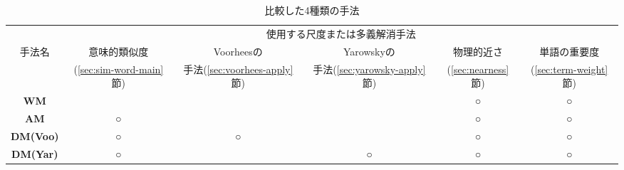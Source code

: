 
\begin{table}[t]
\vspace{-6mm}
\caption{比較した4種類の手法}
\label{tbl:experiment-method}
\small
\begin{center}
\renewcommand{\arraystretch}{}
\begin{tabular}{|c||c|c|c|c|c|}\hline
         & \multicolumn{5}{|c|}{使用する尺度または多義解消手法}\\\cline{2-6}
  手法名 &
  意味的類似度 &
  Voorheesの &
  Yarowskyの &
  物理的近さ &
  単語の重要度 \\[-0.2zh]
   &
  \small(\ref{sec:sim-word-main}節) &
  手法\small(\ref{sec:voorhees-apply}節) &
  手法\small(\ref{sec:yarowsky-apply}節) &
  \small(\ref{sec:nearness}節) &
  \small(\ref{sec:term-weight}節) \\\hline\hline
  {\bf WM}     &    &    &    & ○ & ○\\\hline\hline
  {\bf AM}     & ○ &    &    & ○ & ○\\\hline\hline
 {\bf DM(Voo)} & ○ & ○ &    & ○ & ○\\\hline
 {\bf DM(Yar)} & ○ &    & ○ & ○ & ○\\\hline
\end{tabular}
\end{center}
\end{table}
\vspace*{-1mm}

